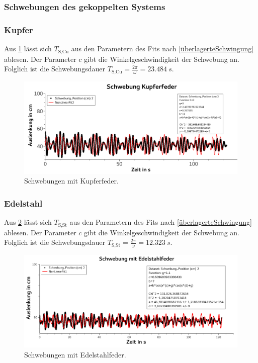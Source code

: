 \documentclass[
	a4paper,
	12pt,
	pagesize,
	ngerman
]{scrartcl}
\begin{document}
	\subsubsection{Schwebungen des gekoppelten Systems}

	\subsubsection*{Kupfer}
	Aus \cref{KupferSchwebung} lässt sich $T_\text{S,Cu}$ aus den Parametern des Fits nach \cref{überlagerteSchwingung} ablesen. Der Parameter $c$ gibt die Winkelgeschwindigkeit der Schwebung an. Folglich ist die Schwebungsdauer $T_\text{S,Cu} = \frac{2\pi}{\omega} = \SI{23,484}{s}$.
	\begin{figure}[H]
		\includegraphics[width=1\textwidth]{KupferSchwebung}
		\centering
		\caption{Schwebungen mit Kupferfeder.}
		\label{KupferSchwebung}
		\centering
	\end{figure}

	\subsubsection*{Edelstahl}
	Aus \cref{EdelstahlSchwebung} lässt sich $T_\text{S,St}$ aus den Parametern des Fits nach \cref{überlagerteSchwingung} ablesen. Der Parameter $c$ gibt die Winkelgeschwindigkeit der Schwebung an. Folglich ist die Schwebungsdauer $T_\text{S,St} = \frac{2\pi}{\omega} = \SI{12,323}{s}$.
	\begin{figure}[H]
		\includegraphics[width=1\textwidth]{EdelstahlSchwebung}
		\centering
		\caption{Schwebungen mit Edelstahlfeder.}
		\label{EdelstahlSchwebung}
		\centering
	\end{figure}
\end{document}

